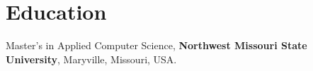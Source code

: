
\vspace{-20pt}
\section*{Education}
\vspace{-20pt}
\noindent Master's in Applied Computer Science, \textbf{Northwest Missouri State University},
Maryville, Missouri, USA.
